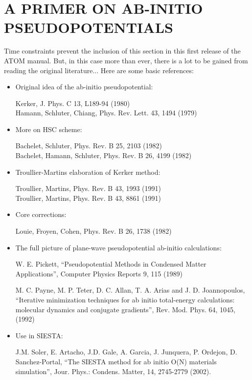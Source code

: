 \documentclass[11pt]{article}
\begin{document}
\section{A PRIMER ON AB-INITIO PSEUDOPOTENTIALS}

Time constraints prevent the inclusion of this section in this first
release of the {\sc ATOM} manual. But, in this case more than ever,
there is a lot to be gained from reading the original literature...
Here are some basic references:

\begin{itemize}
\item Original idea of the ab-initio pseudopotential:

Kerker, J. Phys. C 13, L189-94 (1980)\\
Hamann, Schluter, Chiang, Phys. Rev. Lett. 43, 1494 (1979)

\item More on HSC scheme:

Bachelet, Schluter, Phys. Rev. B 25, 2103 (1982)\\
Bachelet, Hamann, Schluter, Phys. Rev. B 26, 4199 (1982)

\item Troullier-Martins elaboration of Kerker method:

Troullier, Martins, Phys. Rev. B 43, 1993 (1991)\\
Troullier, Martins, Phys. Rev. B 43, 8861 (1991)

\item Core corrections:

Louie, Froyen, Cohen, Phys. Rev. B 26, 1738 (1982)

\item The full picture of plane-wave pseudopotential ab-initio calculations:

W. E. Pickett, ``Pseudopotential Methods in Condensed Matter
Applications'', Computer Physics Reports 9, 115 (1989)

M. C. Payne, M. P. Teter, D. C. Allan, T. A. Arias and
J. D. Joannopoulos, ``Iterative minimization techniques for ab initio
total-energy calculations: molecular dynamics and conjugate
gradients'', Rev. Mod. Phys. 64, 1045, (1992)

\item Use in {\sc SIESTA}:

J.M. Soler, E. Artacho, J.D. Gale, A. Garcia, J. Junquera, P. Ordejon,
D. Sanchez-Portal, ``The SIESTA method for ab initio O(N)
materials simulation'', Jour. Phys.: Condens. Matter, 14, 2745-2779
(2002). 

\end{itemize}
\end{document}
